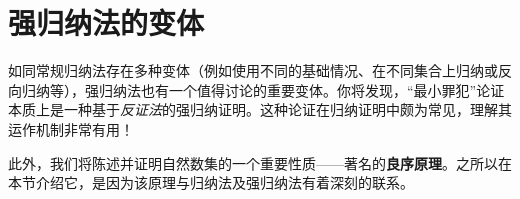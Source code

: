 \section{强归纳法的变体}

如同常规归纳法存在多种变体（例如使用不同的基础情况、在不同集合上归纳或反向归纳等），强归纳法也有一个值得讨论的重要变体。你将发现，``最小罪犯''论证本质上是一种基于\emph{反证法}的强归纳证明。这种论证在归纳证明中颇为常见，理解其运作机制非常有用！

此外，我们将陈述并证明自然数集的一个重要性质——著名的\textbf{良序原理}。之所以在本节介绍它，是因为该原理与归纳法及强归纳法有着深刻的联系。





